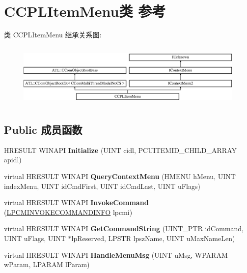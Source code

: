 \hypertarget{class_c_c_p_l_item_menu}{}\section{C\+C\+P\+L\+Item\+Menu类 参考}
\label{class_c_c_p_l_item_menu}
类 C\+C\+P\+L\+Item\+Menu 继承关系图\+:\begin{figure}[H]
\begin{center}
\leavevmode
\includegraphics[height=3.181818cm]{class_c_c_p_l_item_menu}
\end{center}
\end{figure}
\subsection*{Public 成员函数}
\begin{DoxyCompactItemize}
\item 
\mbox{\label{class_c_c_p_l_item_menu_a60a47039a63a6038fdc5e06290242e5c}} 
H\+R\+E\+S\+U\+LT W\+I\+N\+A\+PI {\bfseries Initialize} (U\+I\+NT cidl, P\+C\+U\+I\+T\+E\+M\+I\+D\+\_\+\+C\+H\+I\+L\+D\+\_\+\+A\+R\+R\+AY apidl)
\item 
\mbox{\label{class_c_c_p_l_item_menu_a6f97133430264556ec7d01aba90a010d}} 
virtual H\+R\+E\+S\+U\+LT W\+I\+N\+A\+PI {\bfseries Query\+Context\+Menu} (H\+M\+E\+NU h\+Menu, U\+I\+NT index\+Menu, U\+I\+NT id\+Cmd\+First, U\+I\+NT id\+Cmd\+Last, U\+I\+NT u\+Flags)
\item 
\mbox{\label{class_c_c_p_l_item_menu_aa13846b18662d80d93144a2247b5d25a}} 
virtual H\+R\+E\+S\+U\+LT W\+I\+N\+A\+PI {\bfseries Invoke\+Command} (\hyperlink{struct_i_context_menu_1_1tag_c_m_i_n_v_o_k_e_c_o_m_m_a_n_d_i_n_f_o}{L\+P\+C\+M\+I\+N\+V\+O\+K\+E\+C\+O\+M\+M\+A\+N\+D\+I\+N\+FO} lpcmi)
\item 
\mbox{\label{class_c_c_p_l_item_menu_abb3cd8ac33355fcc51bebf73aadfeca1}} 
virtual H\+R\+E\+S\+U\+LT W\+I\+N\+A\+PI {\bfseries Get\+Command\+String} (U\+I\+N\+T\+\_\+\+P\+TR id\+Command, U\+I\+NT u\+Flags, U\+I\+NT $\ast$lp\+Reserved, L\+P\+S\+TR lpsz\+Name, U\+I\+NT u\+Max\+Name\+Len)
\item 
\mbox{\label{class_c_c_p_l_item_menu_a900f32b3b768c4de9f2ffab630222ab5}} 
virtual H\+R\+E\+S\+U\+LT W\+I\+N\+A\+PI {\bfseries Handle\+Menu\+Msg} (U\+I\+NT u\+Msg, W\+P\+A\+R\+AM w\+Param, L\+P\+A\+R\+AM l\+Param)
\end{DoxyCompactItemize}
